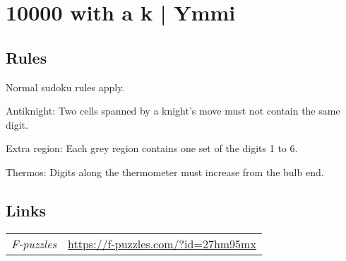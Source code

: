 \section[10000 with a k | Ymmi {[\emph{Sudoku}]}]{10000 with a k | {\normalfont Ymmi}}
\label{sec:05-10000-with-a-k-ymmi}

\subsection*{Rules}
\begin{markdown}
Normal sudoku rules apply.

Antiknight: Two cells spanned by a knight's move must not contain the same digit.

Extra region: Each grey region contains one set of the digits 1 to 6.

Thermos: Digits along the thermometer must increase from the bulb end.
\end{markdown}
\subsection*{Links}
\begin{tabularx}{\textwidth}{l X}
\emph{F-puzzles} & \url{https://f-puzzles.com/?id=27hm95mx} \\
\end{tabularx}
\pagebreak
